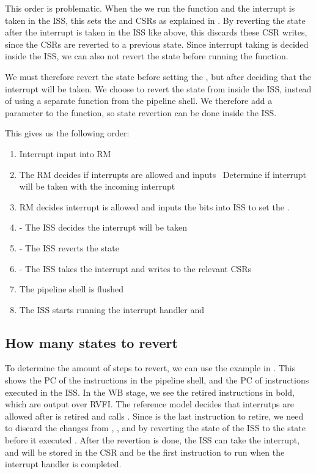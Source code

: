 This order is problematic. When the we run the  function and the interrupt is taken in the ISS, this sets the  and  CSRs as explained in . By reverting the state after the interrupt is taken in the ISS like above, this discards these CSR writes, since the CSRs are reverted to a previous state. Since interrupt taking is decided inside the ISS, we can also not revert the state before running the  function.

We must therefore revert the state before setting the , but after deciding that the interrupt will be taken. We choose to revert the state from inside the ISS, instead of using a separate  function from the pipeline shell. We therefore add a  parameter to the  function, so state revertion can be done inside the ISS.

This gives us the following order:

\begin{enumerate}
    \item Interrupt input into RM
    \item The RM decides if interrupts are allowed and inputs \
    Determine if interrupt will be taken with the incoming interrupt
    \item RM decides interrupt is allowed and inputs the \rv{irq} bits into ISS to set the .
    \item - The ISS decides the interrupt will be taken
    \item - The ISS reverts the state
    \item - The ISS takes the interrupt and writes to the relevant CSRs
    \item The pipeline shell is flushed
    \item The ISS starts running the interrupt handler and 
\end{enumerate}

\subsection{How many states to revert}

To determine the amount of steps to revert, we can use the example in .
This shows the PC of the instructions in the pipeline shell, and the PC of instructions executed in the ISS. In the WB stage, we see the retired instructions in bold, which are output over RVFI. The reference model decides that interrutps are allowed after  is retired and calls . Since  is the last instruction to retire, we need to discard the changes from , , and  by reverting the state of the ISS to the state before it executed . After the revertion is done, the ISS can take the interrupt, and  will be stored in the  CSR and be the first instruction to run when the interrupt handler is completed.

